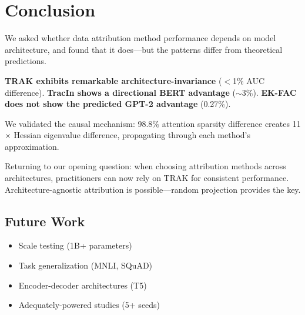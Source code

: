 \section{Conclusion}

We asked whether data attribution method performance depends on model architecture, and found that it does---but the patterns differ from theoretical predictions.

\textbf{TRAK exhibits remarkable architecture-invariance} ($<$1\% AUC difference). \textbf{TracIn shows a directional BERT advantage} ($\sim$3\%). \textbf{EK-FAC does not show the predicted GPT-2 advantage} (0.27\%).

We validated the causal mechanism: 98.8\% attention sparsity difference creates 11$\times$ Hessian eigenvalue difference, propagating through each method's approximation.

Returning to our opening question: when choosing attribution methods across architectures, practitioners can now rely on TRAK for consistent performance. Architecture-agnostic attribution is possible---random projection provides the key.

\subsection{Future Work}

\begin{itemize}
    \item Scale testing (1B+ parameters)
    \item Task generalization (MNLI, SQuAD)
    \item Encoder-decoder architectures (T5)
    \item Adequately-powered studies (5+ seeds)
\end{itemize}
